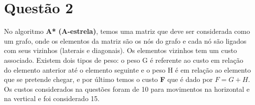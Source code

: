 \documentclass[a4paper, 12pt]{article}
\begin{document}
	\section{Questão 2}
	No algoritmo \textbf{A* (A-estrela)}, temos uma matriz que deve ser considerada como um grafo, onde os elementos da matriz são os nós do grafo e cada nó são ligados com seus vizinhos (laterais e diagonais). Os elementos vizinhos tem um custo associado.
	Existem dois tipos de peso: o peso G é referente ao custo em relação do elemento anterior até o elemento seguinte e o peso H é em relação ao elemento que se pretende chegar, e por último temos o custo \textbf{F} que é dado por $F = G + H$. Os custos considerados na questões foram de 10 para movimentos na horizontal e na vertical e foi considerado 15.\\
	
\end{document}
